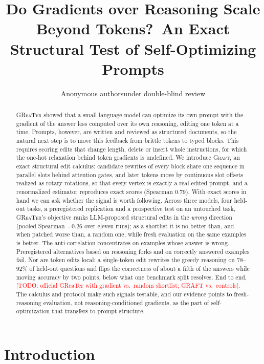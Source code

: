 \documentclass{article}
\title{Do Gradients over Reasoning Scale Beyond Tokens?\ An Exact Structural Test of Self-Optimizing Prompts}
\author{Anonymous authors\Paper under double-blind review}
\newcommand{\graft}{\textsc{Graft}}
\newcommand{\greater}{\textsc{GReaTer}}
\newcommand{\todo}[1]{\textcolor{red}{[TODO: #1]}}
\begin{document}
\maketitle

\begin{abstract}
\greater{} showed that a small language model can optimize its own prompt with the
gradient of the answer loss computed over its own reasoning, editing one token at a
time. Prompts, however, are written and reviewed as structured documents, so the
natural next step is to move this feedback from brittle tokens to typed blocks. This
requires scoring edits that change length, delete or insert whole instructions, for
which the one-hot relaxation behind token gradients is undefined. We introduce
\graft{}, an exact structural edit calculus: candidate rewrites of every block share one
sequence in parallel slots behind attention gates, and later tokens move by continuous
slot offsets realized as rotary rotations, so that every vertex is exactly a real
edited prompt, and a renormalized estimator reproduces exact scores (Spearman $0.79$).
With exact scores in hand we can ask whether the signal is worth following. Across
three models, four held-out tasks, a preregistered replication and a prospective test
on an untouched task, \greater{}'s objective ranks LLM-proposed structural edits in the
\emph{wrong} direction (pooled Spearman $-0.26$ over eleven runs); as a shortlist it is
no better than, and when patched worse than, a random one, while fresh evaluation on
the same examples is better. The anti-correlation concentrates on examples whose answer
is wrong. Preregistered alternatives based on reasoning forks and on correctly answered
examples fail. Nor are token edits local: a single-token edit rewrites the greedy
reasoning on 78--92\% of held-out questions and flips the correctness of about a fifth
of the answers while moving accuracy by two points, below what one benchmark split
resolves. End to end, \todo{official GReaTer with gradient vs.\ random shortlist;
GRAFT vs.\ controls}. The calculus and protocol make such signals testable, and our
evidence points to fresh-reasoning evaluation, not reasoning-conditioned gradients, as
the part of self-optimization that transfers to prompt structure.
\end{abstract}

\section{Introduction}
\label{sec:intro}
\end{document}

